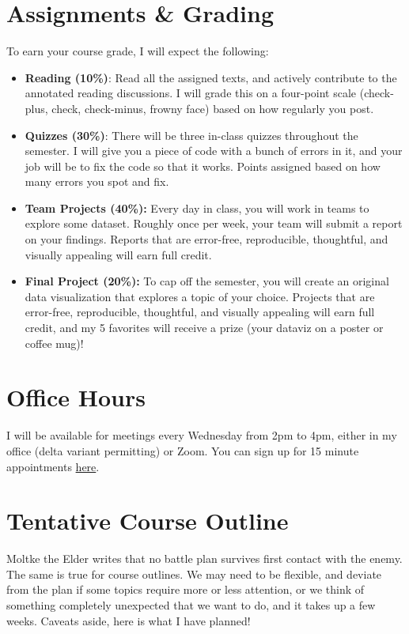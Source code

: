 \documentclass[11pt, letterpaper]{article}
\begin{document}
\section*{Assignments \& Grading}

To earn your course grade, I will expect the following:

\begin{itemize}
	\item \textbf{Reading (10\%)}: Read all the assigned texts, and actively contribute to the annotated reading discussions. I will grade this on a four-point scale (check-plus, check, check-minus, frowny face) based on how regularly you post.
	\item \textbf{Quizzes (30\%)}: There will be three in-class quizzes throughout the semester. I will give you a piece of code with a bunch of errors in it, and your job will be to fix the code so that it works. Points assigned based on how many errors you spot and fix.
	\item \textbf{Team Projects (40\%):} Every day in class, you will work in teams to explore some dataset. Roughly once per week, your team will submit a report on your findings. Reports that are error-free, reproducible, thoughtful, and visually appealing will earn full credit.
	\item \textbf{Final Project (20\%):} To cap off the semester, you will create an original data visualization that explores a topic of your choice. Projects that are error-free, reproducible, thoughtful, and visually appealing will earn full credit, and my 5 favorites will receive a prize (your dataviz on a poster or coffee mug)!
\end{itemize}

\section*{Office Hours}
I will be available for meetings every Wednesday from 2pm to 4pm, either in my office (delta variant permitting) or Zoom. You can sign up for 15 minute appointments \href{https://calendly.com/jornstein/15min}{here}.


\section*{Tentative Course Outline}

Moltke the Elder writes that no battle plan survives first contact with the enemy. The same is true for course outlines. We may need to be flexible, and deviate from the plan if some topics require more or less attention, or we think of something completely unexpected that we want to do, and it takes up a few weeks. Caveats aside, here is what I have planned!
\end{document}

